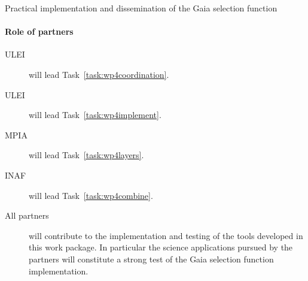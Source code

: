 \begin{workpackage}{Practical implementation and dissemination of the Gaia selection function}
\begin{wpdescription}
    \paragraph{Role of partners}
    \begin{description}
      \item[ULEI] will lead Task~\ref{task:wp4coordination}.
      \item[ULEI] will lead Task~\ref{task:wp4implement}.
      \item[MPIA] will lead Task~\ref{task:wp4layers}.
      \item[INAF] will lead Task~\ref{task:wp4combine}.
      \item[All partners] will contribute to the implementation and testing of the tools developed in this work package. In particular the science applications pursued by the partners will constitute a strong test of the Gaia selection function implementation.
    \end{description}
  \end{wpdescription}

  \begin{wpdeliverables}
    \label{dev:wp4prototypev1}
    \label{dev:wp4prototypev2}
    \label{dev:wp4final}
  \end{wpdeliverables}

\end{workpackage}


